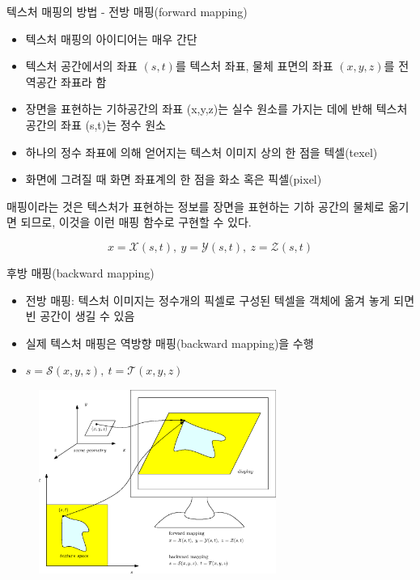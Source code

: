 \documentclass{beamer}
\begin{document}
\begin{frame}[fragile]{텍스처 매핑의 방법 - 전방 매핑(forward mapping)}

\begin{itemize}
\item 텍스처 매핑의 아이디어는 매우 간단
\item 텍스처 공간에서의 좌표 $(s,t)$를 텍스처 좌표, 물체 표면의 좌표 $(x,y,z)$를 전역공간 좌표라 함
\item 장면을 표현하는 기하공간의 좌표 (x,y,z)는 실수 원소를 가지는 데에 반해 텍스처 공간의 좌표 (s,t)는 정수 원소
\item 하나의 정수 좌표에 의해 얻어지는 텍스처 이미지 상의 한 점을 텍셀(texel)
\item 화면에 그려질 때 화면 좌표계의 한 점을 화소 혹은 픽셀(pixel)
\end{itemize}

매핑이라는 것은 텍스처가 표현하는 정보를 장면을 표현하는 기하 공간의 물체로 옮기면 되므로, 이것을 이런 매핑 함수로 구현할 수 있다.

$$x = {\mathcal X}(s,t), ~ y = {\mathcal Y}(s,t), ~ z={\mathcal Z}(s,t)$$

\end{frame}


\begin{frame}[fragile]{후방 매핑(backward mapping)}

\begin{itemize}
\item 전방 매핑: 텍스처 이미지는 정수개의 픽셀로 구성된 텍셀을 객체에 옮겨 놓게 되면 빈 공간이 생길 수 있음
\item 실제 텍스처 매핑은 역방향 매핑(backward mapping)을 수행
\item $s = {\mathcal S}(x,y,z), ~ t = {\mathcal T}(x,y,z)$
\end{itemize}

\begin{figure}[h!]
  \centering
	\includegraphics[height=6cm]{OGL_texture/textureMapping.eps}
\end{figure}

\end{frame}
\end{document}
